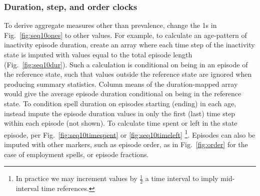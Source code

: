 \documentclass[a4paper,left=1.25cm,right=1.25cm,top=1.25cm,bottom=1.25cm]{article}
\begin{document}
\subsubsection{Duration, step, and order clocks}
To derive aggregate measures other than prevalence, change the 1s in Fig.~\ref{fig:seq10ones} to other values. For example, to calculate an age-pattern of inactivity episode duration, create an array where each time step of the inactivity state is imputed with values equal to the total episode length (Fig.~\ref{fig:seq10dur}). Such a calculation is conditional on being in an episode of the reference state, such that values outside the reference state are ignored when producing summary statistics. Column means of the duration-mapped array would give the average episode duration conditional on being in the reference state. 
To condition spell duration on episodes starting (ending) in each age, instead impute the episode duration values in only the first (last) time step within each episode (not shown). To calculate time spent or left in the state episode, per Fig.~\ref{fig:seq10timespent} or \ref{fig:seq10timeleft} \footnote{In practice we may increment values by $\frac{1}{2}$ a time interval to imply mid-interval time references.}. Episodes can also be imputed with other markers, such as episode order, as in Fig.~\ref{fig:order} for the case of employment spells, or episode fractions. 
\end{document}
